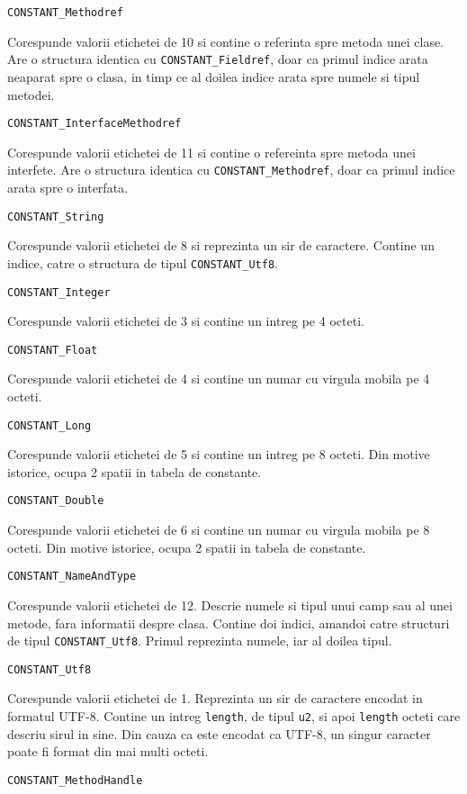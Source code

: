 \texttt{CONSTANT\_Methodref}

Corespunde valorii etichetei de 10 si contine o referinta spre metoda
unei clase. Are o structura identica cu \texttt{CONSTANT\_Fieldref},
doar ca primul indice arata neaparat spre o clasa, in timp ce al doilea
indice arata spre numele si tipul metodei.

\texttt{CONSTANT\_InterfaceMethodref}

Corespunde valorii etichetei de 11 si contine o refereinta spre metoda
unei interfete. Are o structura identica cu
\texttt{CONSTANT\_Methodref}, doar ca primul indice arata spre o
interfata.

\texttt{CONSTANT\_String}

Corespunde valorii etichetei de 8 si reprezinta un sir de caractere.
Contine un indice, catre o structura de tipul \texttt{CONSTANT\_Utf8}.

\texttt{CONSTANT\_Integer}

Corespunde valorii etichetei de 3 si contine un intreg pe 4 octeti.

\texttt{CONSTANT\_Float}

Corespunde valorii etichetei de 4 si contine un numar cu virgula mobila
pe 4 octeti.

\texttt{CONSTANT\_Long}

Corespunde valorii etichetei de 5 si contine un intreg pe 8 octeti. Din
motive istorice, ocupa 2 spatii in tabela de constante.

\texttt{CONSTANT\_Double}

Corespunde valorii etichetei de 6 si contine un numar cu virgula mobila
pe 8 octeti. Din motive istorice, ocupa 2 spatii in tabela de constante.

\texttt{CONSTANT\_NameAndType}

Corespunde valorii etichetei de 12. Descrie numele si tipul unui camp
sau al unei metode, fara informatii despre clasa. Contine doi indici,
amandoi catre structuri de tipul \texttt{CONSTANT\_Utf8}. Primul
reprezinta numele, iar al doilea tipul.

\texttt{CONSTANT\_Utf8}

Corespunde valorii etichetei de 1. Reprezinta un sir de caractere
encodat in formatul UTF-8. Contine un intreg \texttt{length}, de tipul
\texttt{u2}, si apoi \texttt{length} octeti care descriu sirul in sine.
Din cauza ca este encodat ca UTF-8, un singur caracter poate fi format
din mai multi octeti.

\texttt{CONSTANT\_MethodHandle}

